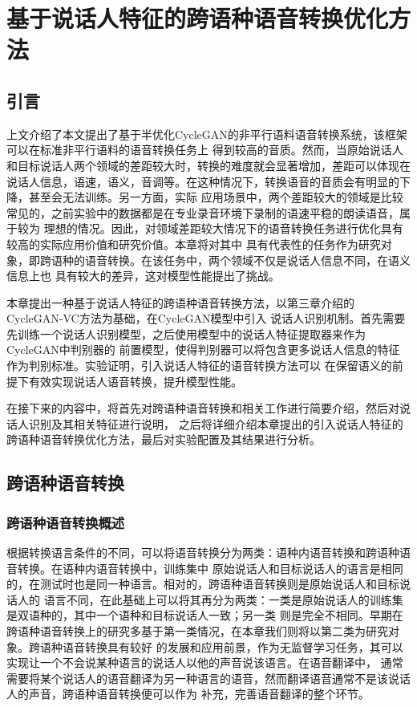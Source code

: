 \chapter{基于说话人特征的跨语种语音转换优化方法}

\section{引言}

上文介绍了本文提出了基于半优化CycleGAN的非平行语料语音转换系统，该框架可以在标准非平行语料的语音转换任务上
得到较高的音质。然而，当原始说话人和目标说话人两个领域的差距较大时，转换的难度就会显著增加，差距可以体现在
说话人信息，语速，语义，音调等。在这种情况下，转换语音的音质会有明显的下降，甚至会无法训练。另一方面，实际
应用场景中，两个差距较大的领域是比较常见的，之前实验中的数据都是在专业录音环境下录制的语速平稳的朗读语音，属于较为
理想的情况。因此，对领域差距较大情况下的语音转换任务进行优化具有较高的实际应用价值和研究价值。本章将对其中
具有代表性的任务作为研究对象，即跨语种的语音转换。在该任务中，两个领域不仅是说话人信息不同，在语义信息上也
具有较大的差异，这对模型性能提出了挑战。

本章提出一种基于说话人特征的跨语种语音转换方法，以第三章介绍的CycleGAN-VC方法为基础，在CycleGAN模型中引入
说话人识别机制。首先需要先训练一个说话人识别模型，之后使用模型中的说话人特征提取器来作为CycleGAN中判别器的
前置模型，使得判别器可以将包含更多说话人信息的特征作为判别标准。实验证明，引入说话人特征的语音转换方法可以
在保留语义的前提下有效实现说话人语音转换，提升模型性能。

在接下来的内容中，将首先对跨语种语音转换和相关工作进行简要介绍，然后对说话人识别及其相关特征进行说明，
之后将详细介绍本章提出的引入说话人特征的跨语种语音转换优化方法，最后对实验配置及其结果进行分析。

\section{跨语种语音转换}
\subsection{跨语种语音转换概述}
根据转换语言条件的不同，可以将语音转换分为两类：语种内语音转换和跨语种语音转换。在语种内语音转换中，训练集中
原始说话人和目标说话人的语言是相同的，在测试时也是同一种语言。相对的，跨语种语音转换则是原始说话人和目标说话人的
语言不同，在此基础上可以将其再分为两类：一类是原始说话人的训练集是双语种的，其中一个语种和目标说话人一致；另一类
则是完全不相同。早期在跨语种语音转换上的研究多基于第一类情况，在本章我们则将以第二类为研究对象。跨语种语音转换具有较好
的发展和应用前景，作为无监督学习任务，其可以实现让一个不会说某种语言的说话人以他的声音说该语言。在语音翻译中，
通常需要将某个说话人的语音翻译为另一种语言的语音，然而翻译语音通常不是该说话人的声音，跨语种语音转换便可以作为
补充，完善语音翻译的整个环节。

